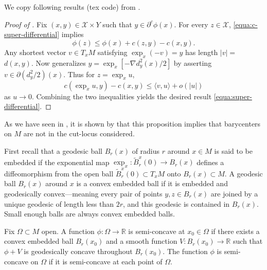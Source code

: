 We copy following results (tex code) from \cite{cordero2001riemannian}.

\begin{proof}[Proof of ]
	Fix \( ( x , y ) \in \mathcal{X} \times Y \) such that \( y \in \partial ^ { c } \phi ( x ) \).
	For every \( z \in \mathcal{X} \), \cref{equa:c-super-differential} implies
	\[ \phi ( z ) \leq \phi ( x ) + c ( z , y ) - c ( x , y ) .\]
	Any shortest vector \( v \in T _ { x } M \) satisfying \( \exp _ { x } ( - v ) = y \) has length \( | v | = \)
	\( d ( x , y )  \).
	Now  \cite[Proposition 6]{mccann2001polar} generalizes
	\( y = \exp _ { x } \left[ - \nabla d _ { y } ^ { 2 } ( x ) / 2 \right] \)
	by asserting \( v \in \partial \left( d _ { y } ^ { 2 } / 2 \right) ( x ) \).
	Thus for \( z = \exp _ { x } u \),
	\[ c \left( \exp _ { x } u , y \right) - c ( x , y ) \leq \langle v , u \rangle + o ( | u | ) \]
	as \( u \rightarrow 0 \).
	Combining the two inequalities yields the desired result \cref{equa:super-differential}.
\end{proof}
As we have seen in ,
it is shown by \cite[Lemma 3.1]{kim2015multi} that this proposition implies
that barycenters on $M$ are not in the cut-locus considered.

First recall that a geodesic ball \( B _ { r } ( x ) \) of radius \( r \) around \( x \in M \) is said to be embedded
if the exponential map \( \exp _ { x } : \tilde { B } _ { r } ^ { x } ( 0 ) \rightarrow B _ { r } ( x ) \) defines
a diffeomorphism from the open ball \( \tilde { B } _ { r } ^ { x } ( 0 ) \subset T _ { x } M \) onto \( B _ { r } ( x ) \subset M \).
A geodesic ball \( B _ { r } ( x ) \) around \( x \) is a convex embedded ball
if it is embedded and geodesically convex---meaning every pair of points \( y , z \in B _ { r } ( x ) \)
are joined by a unique geodesic of length less than \( 2 r \),
and this geodesic is contained in \( B _ { r } ( x )\).
Small enough balls are always convex embedded balls.

\begin{defn}
	\label{defn:semi-concavity}
	Fix \( \Omega \subset M \) open.
	A function \( \phi : \Omega \rightarrow \mathbb { R } \) is semi-concave at \( x _ { 0 } \in \Omega \)
	if there exists a convex embedded ball \( B _ { r } \left( x _ { 0 } \right) \) and
	a smooth function \( V : B _ { r } \left( x _ { 0 } \right) \rightarrow \mathbb { R } \)
	such that \( \phi + V \) is geodesically concave throughout \( B _ { r } \left( x _ { 0 } \right)\).
	The function \( \phi \) is semi-concave on \( \Omega \) if
	it is semi-concave at each point of \( \Omega \).
\end{defn}

